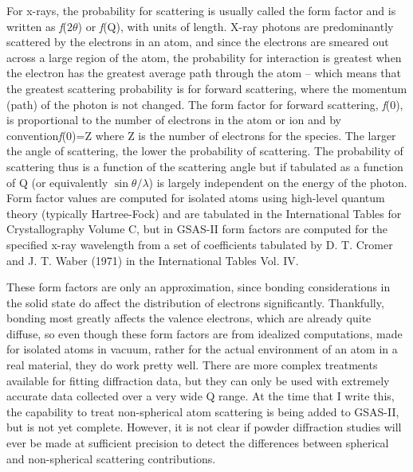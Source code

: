For x-rays, the probability for scattering is usually called the form factor and is written as \textit{f}($2\theta$) or \textit{f}(Q), with units of length. X-ray photons are predominantly scattered by the electrons in an atom, and since the electrons are smeared out across a large region of the atom, the probability for interaction is greatest when the electron has the greatest average path through the atom -- which means that the greatest scattering probability is for forward scattering, where the momentum (path) of the photon is not changed. The form factor for forward scattering, \textit{f}(0), is proportional to the number of electrons in the atom or ion and by convention\textit{f}(0)=Z where Z is the number of electrons for the species. The larger the angle of scattering, the lower the probability of scattering. The probability of scattering thus is a function of the scattering angle but if tabulated as a function of Q (or equivalently $\sin\theta/\lambda$) is largely independent on the energy of the photon. Form factor values are computed for isolated atoms using high-level quantum theory (typically Hartree-Fock) and are tabulated in the International Tables for Crystallography Volume C, but in GSAS-II form factors are computed for the specified x-ray wavelength from a set of coefficients tabulated by D. T. Cromer and J. T. Waber (1971) in the International Tables Vol. IV. 

These form factors are only an approximation, since bonding considerations in the solid state do affect the distribution of electrons significantly. Thankfully, bonding most greatly affects the valence electrons, which are already quite diffuse, so even though these form factors are from idealized computations, made for isolated atoms in vacuum, rather for the actual environment of an atom in a real material, they do work pretty well. There are more complex treatments available for fitting diffraction data, but they can only be used with extremely accurate data collected over a very wide Q range. At the time that I write this, the capability to treat non-spherical atom scattering is being added to GSAS-II, but is not yet complete. However, it is not clear if powder diffraction studies will ever be made at sufficient precision to detect the differences between spherical and non-spherical scattering contributions.

